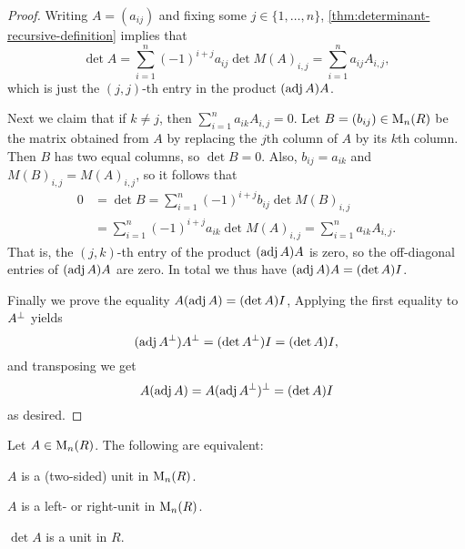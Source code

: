 \begin{proof}
    Writing $A = (a_{ij})$ and fixing some $j \in \{1, \ldots, n\}$, \cref{thm:determinant-recursive-definition} implies that
    \begin{equation*}
        \det A
            = \sum_{i=1}^n (-1)^{i+j} a_{ij} \det M(A)_{i,j}
            = \sum_{i=1}^n a_{ij} A_{i,j},
    \end{equation*}
    which is just the $(j,j)$-th entry in the product $(\operatorname{adj} A)A$.

    Next we claim that if $k \neq j$, then $\sum_{i=1}^n a_{ik} A_{i,j} = 0$. Let $B = (b_{ij}) \in \mathrm{M}_{n}(R)$ be the matrix obtained from $A$ by replacing the $j$th column of $A$ by its $k$th column. Then $B$ has two equal columns, so $\det B = 0$. Also, $b_{ij} = a_{ik}$ and $M(B)_{i,j} = M(A)_{i,j}$, so it follows that
    \begin{align*}
        0
            &= \det B
             = \sum_{i=1}^n (-1)^{i+j} b_{ij} \det M(B)_{i,j} \\
            &= \sum_{i=1}^n (-1)^{i+j} a_{ik} \det M(A)_{i,j}
             = \sum_{i=1}^n a_{ik} A_{i,j}.
    \end{align*}
    That is, the $(j,k)$-th entry of the product $(\operatorname{adj} A)A$ is zero, so the off-diagonal entries of $(\operatorname{adj} A)A$ are zero. In total we thus have $(\operatorname{adj} A)A = (\det A) I$.

    Finally we prove the equality $A(\operatorname{adj} A) = (\det A) I$, Applying the first equality to $A^\bot$ yields
    \begin{equation*}
        (\operatorname{adj} A^\bot) A^\bot
            = (\det A^\bot)I
            = (\det A)I,
    \end{equation*}
    and transposing we get
    \begin{equation*}
        A (\operatorname{adj} A)
            = A (\operatorname{adj} A^\bot)^\bot
            = (\det A) I
    \end{equation*}
    as desired.
\end{proof}

\begin{corollary}
    Let $A \in \mathrm{M}_{n}(R)$. The following are equivalent:
    \begin{enumcorollary}
        \item $A$ is a (two-sided) unit in $\mathrm{M}_{n}(R)$.
        \item $A$ is a left- or right-unit in $\mathrm{M}_{n}(R)$.
        \item $\det A$ is a unit in $R$.
    \end{enumcorollary}
\end{corollary}

